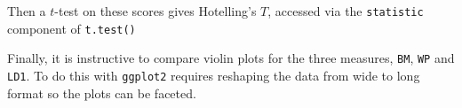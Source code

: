 \documentclass[
  letterpaper,
  10pt,
  krantz2]{krantz}
\makeatletter
\newenvironment{Shaded}{\begin{snugshade}}{\end{snugshade}}
\newcommand{\AttributeTok}[1]{\textcolor[rgb]{0.40,0.45,0.13}{#1}}
\newcommand{\CommentTok}[1]{\textcolor[rgb]{0.37,0.37,0.37}{#1}}
\newcommand{\DecValTok}[1]{\textcolor[rgb]{0.68,0.00,0.00}{#1}}
\newcommand{\FunctionTok}[1]{\textcolor[rgb]{0.28,0.35,0.67}{#1}}
\newcommand{\NormalTok}[1]{\textcolor[rgb]{0.00,0.23,0.31}{#1}}
\newcommand{\OtherTok}[1]{\textcolor[rgb]{0.00,0.23,0.31}{#1}}
\newcommand{\SpecialCharTok}[1]{\textcolor[rgb]{0.37,0.37,0.37}{#1}}
\newenvironment{kframe}{%
  \medskip{}
  \setlength{\fboxsep}{.8em}
  \def\at@end@of@kframe{}%
  \ifinner\ifhmode%
  \def\at@end@of@kframe{\end{minipage}}%
  \begin{minipage}{\columnwidth}%
  \fi\fi%
  \def\FrameCommand##1{\hskip\@totalleftmargin \hskip-\fboxsep
  \colorbox{shadecolor}{##1}\hskip-\fboxsep
      \hskip-\linewidth \hskip-\@totalleftmargin \hskip\columnwidth}%
  \MakeFramed {\advance\hsize-\width
    \@totalleftmargin\z@ \linewidth\hsize
    \@setminipage}}%
{\par\unskip\endMakeFramed%
  \at@end@of@kframe}
\renewenvironment{Shaded}{\begin{kframe}}{\end{kframe}}
\makeatother
\begin{document}
Then a \(t\)-test on these scores gives Hotelling's \(T\), accessed via
the \texttt{statistic} component of \texttt{t.test()}

\begin{Shaded}
\end{Shaded}

Finally, it is instructive to compare violin plots for the three
measures, \texttt{BM}, \texttt{WP} and \texttt{LD1}. To do this with
\texttt{ggplot2} requires reshaping the data from wide to long format so
the plots can be faceted.
\end{document}
